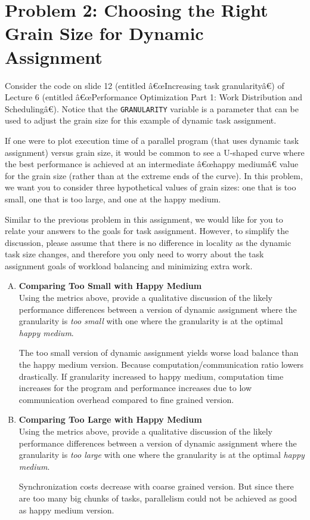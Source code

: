 \documentclass[11pt]{article}
\newenvironment{choice}{\begin{enumerate}[A.]}{\end{enumerate}}
\newenvironment{answer}{\begin{minipage}[c][1.5in]{\textwidth}}{\end{minipage}}
\begin{document}
\section*{Problem 2: Choosing the Right Grain Size for Dynamic Assignment}
Consider the code on slide 12 (entitled â€œIncreasing task granularityâ€) of Lecture 6 (entitled â€œPerformance Optimization Part 1: Work Distribution and Schedulingâ€). Notice that the \texttt{GRANULARITY} variable is a parameter that can be used to adjust the grain size for this example of dynamic task assignment.

If one were to plot execution time of a parallel program (that uses dynamic task assignment) versus grain size, it would be common to see a U-shaped curve where the best performance is achieved at an intermediate â€œhappy mediumâ€ value for the grain size (rather than at the extreme ends of the curve). In this problem, we want you to consider three hypothetical values of grain sizes: one that is too small, one that is too large, and one at the happy medium.

Similar to the previous problem in this assignment, we would like for you to relate your answers to the goals for task assignment. However, to simplify the discussion, please assume that there is no difference in locality as the dynamic task size changes, and therefore you only need to worry about the task assignment goals of workload balancing and minimizing extra work.

\begin{choice}
\item \textbf{Comparing Too Small with Happy Medium}\\
Using the metrics above, provide a qualitative discussion of the likely performance differences between a version of dynamic assignment where the granularity is \textit{too small} with one where the granularity is at the optimal \textit{happy medium}.

\begin{answer}
The too small version of dynamic assignment yields worse load balance than the happy medium version. Because computation/communication ratio lowers drastically. If granularity increased to happy medium, computation time increases for the program and performance increases due to low communication overhead compared to fine grained version.
\end{answer}

\item \textbf{Comparing Too Large with Happy Medium}\\
Using the metrics above, provide a qualitative discussion of the likely performance differences between a version of dynamic assignment where the granularity is \textit{too large} with one where the granularity is at the optimal \textit{happy medium}.

\begin{answer}
Synchronization costs decrease with coarse grained version. But since there are too many big chunks of tasks, parallelism could not be achieved as good as happy medium version.
\end{answer}
\end{choice}
\end{document}

